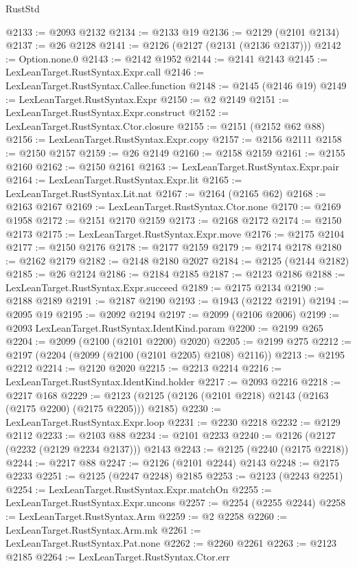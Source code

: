\begin{lexlean}{RustStd}
\begin{coremodule}
@2133 := @2093 @2132
@2134 := @2133 @19
@2136 := @2129 (@2101 @2134)
@2137 := @26 @2128
@2141 := @2126 (@2127 (@2131 (@2136 @2137)))
@2142 := Option.none.{0}
@2143 := @2142 @1952
@2144 := @2141 @2143
@2145 := LexLeanTarget.RustSyntax.Expr.call
@2146 := LexLeanTarget.RustSyntax.Callee.function
@2148 := @2145 (@2146 @19)
@2149 := LexLeanTarget.RustSyntax.Expr
@2150 := @2 @2149
@2151 := LexLeanTarget.RustSyntax.Expr.construct
@2152 := LexLeanTarget.RustSyntax.Ctor.closure
@2155 := @2151 (@2152 @62 @88)
@2156 := LexLeanTarget.RustSyntax.Expr.copy
@2157 := @2156 @2111
@2158 := @2150 @2157
@2159 := @26 @2149
@2160 := @2158 @2159
@2161 := @2155 @2160
@2162 := @2150 @2161
@2163 := LexLeanTarget.RustSyntax.Expr.pair
@2164 := LexLeanTarget.RustSyntax.Expr.lit
@2165 := LexLeanTarget.RustSyntax.Lit.nat
@2167 := @2164 (@2165 @62)
@2168 := @2163 @2167
@2169 := LexLeanTarget.RustSyntax.Ctor.none
@2170 := @2169 @1958
@2172 := @2151 @2170 @2159
@2173 := @2168 @2172
@2174 := @2150 @2173
@2175 := LexLeanTarget.RustSyntax.Expr.move
@2176 := @2175 @2104
@2177 := @2150 @2176
@2178 := @2177 @2159
@2179 := @2174 @2178
@2180 := @2162 @2179
@2182 := @2148 @2180 @2027
@2184 := @2125 (@2144 @2182)
@2185 := @26 @2124
@2186 := @2184 @2185
@2187 := @2123 @2186
@2188 := LexLeanTarget.RustSyntax.Expr.succeed
@2189 := @2175 @2134
@2190 := @2188 @2189
@2191 := @2187 @2190
@2193 := @1943 (@2122 @2191)
@2194 := @2095 @19
@2195 := @2092 @2194
@2197 := @2099 (@2106 @2006)
@2199 := @2093 LexLeanTarget.RustSyntax.IdentKind.param
@2200 := @2199 @265
@2204 := @2099 (@2100 (@2101 @2200) @2020)
@2205 := @2199 @275
@2212 := @2197 (@2204 (@2099 (@2100 (@2101 @2205) @2108) @2116))
@2213 := @2195 @2212
@2214 := @2120 @2020
@2215 := @2213 @2214
@2216 := LexLeanTarget.RustSyntax.IdentKind.holder
@2217 := @2093 @2216
@2218 := @2217 @168
@2229 := @2123 (@2125 (@2126 (@2101 @2218) @2143 (@2163 (@2175 @2200) (@2175 @2205))) @2185)
@2230 := LexLeanTarget.RustSyntax.Expr.loop
@2231 := @2230 @2218
@2232 := @2129 @2112
@2233 := @2103 @88
@2234 := @2101 @2233
@2240 := @2126 (@2127 (@2232 (@2129 @2234 @2137))) @2143
@2243 := @2125 (@2240 (@2175 @2218))
@2244 := @2217 @88
@2247 := @2126 (@2101 @2244) @2143
@2248 := @2175 @2233
@2251 := @2125 (@2247 @2248) @2185
@2253 := @2123 (@2243 @2251)
@2254 := LexLeanTarget.RustSyntax.Expr.matchOn
@2255 := LexLeanTarget.RustSyntax.Expr.uncons
@2257 := @2254 (@2255 @2244)
@2258 := LexLeanTarget.RustSyntax.Arm
@2259 := @2 @2258
@2260 := LexLeanTarget.RustSyntax.Arm.mk
@2261 := LexLeanTarget.RustSyntax.Pat.none
@2262 := @2260 @2261
@2263 := @2123 @2185
@2264 := LexLeanTarget.RustSyntax.Ctor.err

\end{coremodule}
\end{lexlean}
